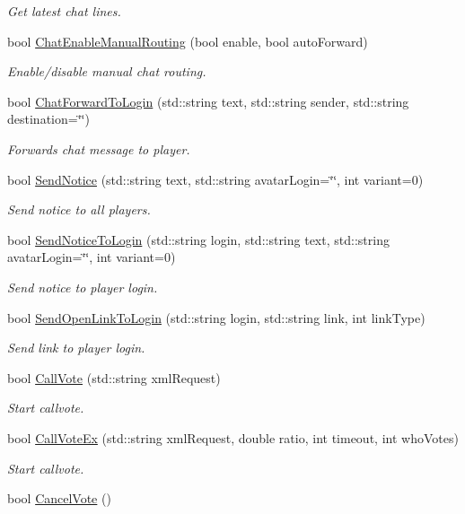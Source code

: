 \begin{DoxyCompactItemize}
\begin{DoxyCompactList}\small\item\em Get latest chat lines. \end{DoxyCompactList}\item 
bool \hyperlink{classMethods_aa6aed7b14ccfce003243e7d21fec70b4}{Chat\-Enable\-Manual\-Routing} (bool enable, bool auto\-Forward)
\begin{DoxyCompactList}\small\item\em Enable/disable manual chat routing. \end{DoxyCompactList}\item 
bool \hyperlink{classMethods_ab0a918ef2ae8ba45fa350f023d7174ab}{Chat\-Forward\-To\-Login} (std\-::string text, std\-::string sender, std\-::string destination=\char`\"{}\char`\"{})
\begin{DoxyCompactList}\small\item\em Forwards chat message to player. \end{DoxyCompactList}\item 
bool \hyperlink{classMethods_add538878f839a6a5078fec808e1f064f}{Send\-Notice} (std\-::string text, std\-::string avatar\-Login=\char`\"{}\char`\"{}, int variant=0)
\begin{DoxyCompactList}\small\item\em Send notice to all players. \end{DoxyCompactList}\item 
bool \hyperlink{classMethods_a7229aacea5b60d1d502c5df39f10a50c}{Send\-Notice\-To\-Login} (std\-::string login, std\-::string text, std\-::string avatar\-Login=\char`\"{}\char`\"{}, int variant=0)
\begin{DoxyCompactList}\small\item\em Send notice to player login. \end{DoxyCompactList}\item 
bool \hyperlink{classMethods_a40beaa6cb9c971d8272d4166bde74524}{Send\-Open\-Link\-To\-Login} (std\-::string login, std\-::string link, int link\-Type)
\begin{DoxyCompactList}\small\item\em Send link to player login. \end{DoxyCompactList}\item 
bool \hyperlink{classMethods_a189f5fa70efe5470c45ecaa6d9824c0c}{Call\-Vote} (std\-::string xml\-Request)
\begin{DoxyCompactList}\small\item\em Start callvote. \end{DoxyCompactList}\item 
bool \hyperlink{classMethods_a55b27e8f8523061c7815ecf577bee604}{Call\-Vote\-Ex} (std\-::string xml\-Request, double ratio, int timeout, int who\-Votes)
\begin{DoxyCompactList}\small\item\em Start callvote. \end{DoxyCompactList}\item 
\hypertarget{classMethods_ae7584b3c482480bbd2d3321a11e0b3b5}{bool \hyperlink{classMethods_ae7584b3c482480bbd2d3321a11e0b3b5}{Cancel\-Vote} ()}\label{classMethods_ae7584b3c482480bbd2d3321a11e0b3b5}


\end{DoxyCompactItemize}
